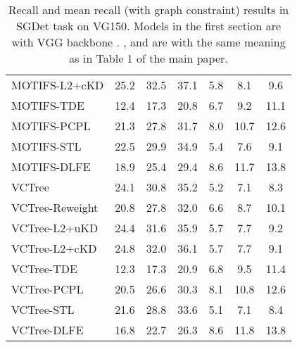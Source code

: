 \documentclass[sigconf]{acmart}
\begin{document}
\begin{table*}[htbp]
{\begin{tabular}{l |c c c c c c}
MOTIFS-L2+cKD\textsuperscript{} \cite{DBLP:conf/bmvc/WangPL20} & 25.2 & 32.5 & 37.1 & 5.8 & 8.1 & 9.6 \\
MOTIFS-TDE\textsuperscript{} \cite{tang2020unbiased} & 12.4 & 17.3 & 20.8 & 6.7 & 9.2 & 11.1 \\
MOTIFS-PCPL\textsuperscript{} \cite{yan2020pcpl} & 21.3 & 27.8 & 31.7 & 8.0 & 10.7 & 12.6 \\
MOTIFS-STL\textsuperscript{} \cite{chen2019soft} & 22.5 & 29.9 & 34.9 & 5.4 & 7.6 & 9.1 \\
MOTIFS-DLFE & 18.9 & 25.4 & 29.4 & 8.6 & 11.7 & 13.8 \\
\hline
VCTree\textsuperscript{} \cite{tang2019learning,tang2020unbiased} & 24.1 & 30.8 & 35.2 & 5.2 & 7.1 & 8.3 \\
VCTree-Reweight\textsuperscript{} & 20.8 & 27.8 & 32.0 & 6.6 & 8.7 & 10.1\\
VCTree-L2+uKD\textsuperscript{} \cite{DBLP:conf/bmvc/WangPL20} & 24.4 & 31.6 & 35.9 & 5.7 & 7.7 & 9.2 \\ 
VCTree-L2+cKD\textsuperscript{} \cite{DBLP:conf/bmvc/WangPL20} & 24.8 & 32.0 & 36.1 & 5.7 & 7.7 & 9.1 \\ 
VCTree-TDE\textsuperscript{} \cite{tang2020unbiased} & 12.3 & 17.3 & 20.9 & 6.8 & 9.5 & 11.4 \\
VCTree-PCPL\textsuperscript{} \cite{yan2020pcpl} & 20.5 & 26.6 & 30.3 & 8.1 & 10.8 & 12.6 \\
VCTree-STL\textsuperscript{} \cite{chen2019soft} & 21.6 & 28.8 & 33.6 & 5.1 & 7.1 & 8.4 \\
VCTree-DLFE & 16.8 & 22.7 & 26.3 & 8.6 & 11.8 & 13.8 \\
\hline
\end{tabular}
}
\vspace{0.1em}
\caption{Recall and mean recall (with graph constraint) results in SGDet task on VG150. 
Models in the first section are with VGG backbone \cite{simonyan2014very}.
,  and  are with the same meaning as in Table 1 of the main paper.
}
\label{tab:sgg_result_sgdet}
\end{table*}
\end{document}
